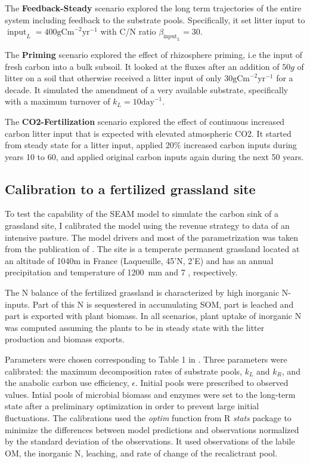 The \textbf{Feedback-Steady} scenario explored the long term trajectories of the
entire system including feedback to the substrate pools. Specifically, it set
litter input to $\operatorname{input}_L = 400\mathrm{gCm}^{-2}\mathrm{yr}^{-1}$
with C/N ratio $\beta_{\operatorname{input}_L} = 30$.

The \textbf{Priming} scenario explored the effect of rhizosphere priming, i.e
the input of fresh carbon into a bulk subsoil. It looked at the fluxes after
an addition of $50g$ of litter on a soil that otherwise
received a litter input of only $30\mathrm{gCm}^{-2}\mathrm{yr}^{-1}$ for a
decade. It simulated the amendment of a very available substrate, specifically
with a maximum turnover of $k_L = 10\mathrm{day}^{-1}$.

The \textbf{CO2-Fertilization} scenario explored the effect of continuous 
increased carbon litter input that is expected with elevated atmospheric CO2.
It started from steady state for a litter input, applied 20\% increased
carbon inputs during years 10 to 60, and applied original carbon inputs again
during the next 50 years.

\subsection{Calibration to a fertilized grassland site}
\label{sec:methodsPasture}

To test the capability of the SEAM model to simulate the carbon sink of a
grassland site, I calibrated the model using the revenue strategy to data of an
intensive pasture.
The model drivers and most of the parametrization was taken from the publication
of \citep{Perveen14}. The site is a temperate permanent grassland located at an
altitude of 1040m in France (Laqueuille, 45'N,
2'E) and has an annual precipitation and temperature of 1200~mm
and 7 , respectively.

The N balance of the fertilized grassland is characterized by high inorganic
N-inputs. Part of this N is sequestered in accumulating SOM, part is leached and
part is exported with plant biomass. In all scenarios, plant uptake of inorganic N was
computed assuming the plants to be in steady state with the litter
production and biomass exports.
 
Parameters were chosen corresponding to Table 1 in \citep{Perveen14}. Three
parameters were calibrated: the maximum decomposition rates of substrate pools,
$k_L$ and $k_R$, and the anabolic carbon use efficiency, $\epsilon$. Initial
pools were prescribed to observed values. Intial pools of microbial biomass and
enzymes were set to the long-term state after a preliminary optimization in
order to prevent large initial fluctuations. The calibrations used the
\textit{optim} function from R \textit{stats} package \citep{R07} to minimize
the differences between model predictions and observations normalized by the
standard deviation of the observations. It used observations of the labile
OM, the inorganic N, leaching, and rate of change of the recalictrant pool.
 
